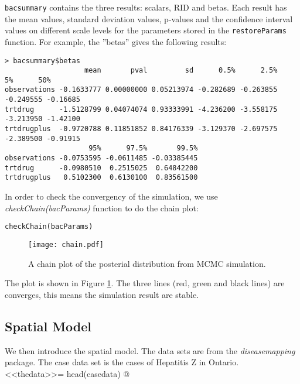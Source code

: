 \documentclass{article}
\begin{document}
\verb!bacsummary! contains the three results: scalars, RID and betas. Each result has the mean values, standard deviation values, p-values and the confidence interval values on different scale levels for the parameters stored in the \verb!restoreParams! function. 
For example, the ''betas'' gives the following results:
\begin{verbatim}
> bacsummary$betas
                   mean       pval         sd      0.5%      2.5%        5%      50%
observations -0.1633777 0.00000000 0.05213974 -0.282689 -0.263855 -0.249555 -0.16685
trtdrug      -1.5128799 0.04074074 0.93333991 -4.236200 -3.558175 -3.213950 -1.42100
trtdrugplus  -0.9720788 0.11851852 0.84176339 -3.129370 -2.697575 -2.389500 -0.91915
                    95%      97.5%       99.5%
observations -0.0753595 -0.0611485 -0.03385445
trtdrug      -0.0980510  0.2515025  0.64842200
trtdrugplus   0.5102300  0.6130100  0.83561500

\end{verbatim}
 

In order to check the convergency of the simulation, we use \textit{checkChain(bacParams)} function to do the chain plot:
\begin{verbatim}
checkChain(bacParams)
\end{verbatim}



\begin{figure}[ht]
\begin{center}
\texttt{[image: chain.pdf]}
\caption{A chain plot of the posterial distribution from MCMC simulation.}\label{chain}
\end{center}
\end{figure}

The plot is shown in Figure \ref{chain}. The three lines (red, green and black lines) are converges, this means the simulation result are stable. 

\subsection{Spatial Model} 
We then introduce the spatial model. The data sets are from the \textit{diseasemapping} package. 
The case data set is the cases of Hepatitis Z in Ontario. 
<<thedata>>=
head(casedata)
@
\end{document}
